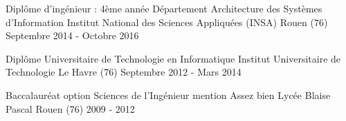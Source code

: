 

\begin{cventries}

  \cventry
    {Diplôme d'ingénieur : 4ème année Département Architecture des Systèmes d'Information} %
    {Institut National des Sciences Appliquées (INSA)} %
    {Rouen (76)} %
    {Septembre 2014 - Octobre 2016} %
    {
    }
    
  \cventry
	{Diplôme Universitaire de Technologie en Informatique} %
	{Institut Universitaire de Technologie} %
	{Le Havre (76)} %
	{Septembre 2012 - Mars 2014} %
	{}
	
  \cventry
	{Baccalauréat option Sciences de l'Ingénieur mention Assez bien} %
	{Lycée Blaise Pascal} %
	{Rouen (76)} %
	{2009 - 2012} %
	{}
	
	
\end{cventries}
